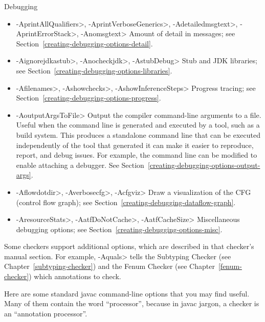 Debugging
\begin{itemize}
\item
 \<-AprintAllQualifiers>,
 \<-AprintVerboseGenerics>,
 \<-Adetailedmsgtext>,
 \<-AprintErrorStack>,
 \<-Anomsgtext>
Amount of detail in messages; see Section~\ref{creating-debugging-options-detail}.

\item
 \<-Aignorejdkastub>,
 \<-Anocheckjdk>,
 \<-AstubDebug>
Stub and JDK libraries; see Section~\ref{creating-debugging-options-libraries}.

\item
 \<-Afilenames>,
 \<-Ashowchecks>,
 \<-AshowInferenceSteps>
Progress tracing; see Section~\ref{creating-debugging-options-progress}.

\item
\<-AoutputArgsToFile>
Output the compiler command-line arguments to a file.  Useful when the
command line is generated and executed by a tool, such as a build system.
This produces a standalone command line that can be executed independently
of the tool that generated it can make it easier to reproduce, report, and
debug issues.  For example, the command line can be modified to enable
attaching a debugger.
See Section~\ref{creating-debugging-options-output-args}.

\item
 \<-Aflowdotdir>,
 \<-Averbosecfg>,
 \<-Acfgviz>
 Draw a visualization of the CFG (control flow graph); see
 Section~\ref{creating-debugging-dataflow-graph}.

\item
 \<-AresourceStats>,
 \<-AatfDoNotCache>,
 \<-AatfCacheSize>
Miscellaneous debugging options; see Section~\ref{creating-debugging-options-misc}.

\end{itemize}


\noindent
Some checkers support additional options, which are described in that
checker's manual section.
For example, \<-Aquals> tells
the Subtyping Checker (see Chapter~\ref{subtyping-checker}) and the Fenum Checker
(see Chapter~\ref{fenum-checker}) which annotations to check.


Here are some standard javac command-line options that you may find useful.
Many of them contain the word ``processor'', because in javac jargon, a
checker is an ``annotation processor''.

